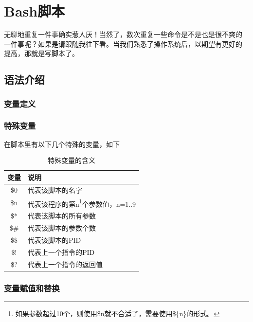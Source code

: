 \chapter{Bash脚本}
\label{sec:shellScript}

无聊地重复一件事确实惹人厌！当然了，数次重复一些命令是不是也是很不爽的
一件事呢？如果是请跟随我往下看。当我们熟悉了操作系统后，以期望有更好的
提高，那就是写脚本了。







\section{语法介绍}

\subsection{变量定义}

\subsection{特殊变量}

在脚本里有以下几个特殊的变量，如下

\begin{table}[htbp]
  \centering
  \caption{特殊变量的含义}
  \label{tab:specialVariables}
  \begin{tabular}{cl}
    \toprule
    变量  & 说明 \\
    \midrule
    \$0   & 代表该脚本的名字 \\
    \$n   & 代表该程序的第n\footnote{如果参数超过10个，则使用\$n就不合适了，需要使用\$\{n\}的形式。}个参数值，n=1..9 \\
    \$*   & 代表该脚本的所有参数 \\
    \$\#  & 代表该脚本的参数个数 \\
    \$\$  & 代表该脚本的PID \\
    \$!   & 代表上一个指令的PID \\
    \$?   & 代表上一个指令的返回值 \\
    \bottomrule
  \end{tabular}
\end{table}

\subsection{变量赋值和替换}

